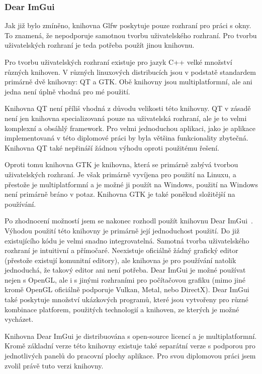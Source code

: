 \documentclass[czech,master]{diploma}
\begin{document}
\subsubsection{Dear ImGui}
Jak již bylo zmíněno, knihovna Glfw poskytuje pouze rozhraní pro práci s okny. To znamená, že nepodporuje samotnou tvorbu uživatelského rozhraní. Pro tvorbu uživatelských rozhraní je teda potřeba použít jinou knihovnu.\par
Pro tvorbu uživatelských rozhraní existuje pro jazyk C++ velké množství různých knihoven. V různých linuxových distribucích jsou v podstatě standardem primárně dvě knihovny: QT a GTK\@. Obě knihovny jsou multiplatformní, ale ani jedna není úplně vhodná pro mé použití.\par Knihovna QT není příliš vhodná z důvodu velikosti této knihovny. QT v zásadě není jen knihovna specializovaná pouze na uživatelská rozhraní, ale je to velmi komplexní a obsáhlý framework. Pro velmi jednoduchou aplikaci, jako je aplikace implementovaná v této diplomové práci by byla většina funkcionality zbytečná. Knihovna QT také nepřináší žádnou výhodu oproti použitému řešení.\par
Oproti tomu knihovna GTK je knihovna, která se primárně zabývá tvorbou uživatelských rozhraní. Je však primárně vyvíjena pro použití na Linuxu, a přestože je multiplatformní a je možné ji použít na Windows, použití na Windows není primárně bráno v potaz. Knihovna GTK je také poněkud složitější na používání.\par
Po zhodnocení možností jsem se nakonec rozhodl použít knihovnu Dear ImGui~\cite{sourceImgui}. Výhodou použití této knihovny je primárně její jednoduchost použití. Do již existujícího kódu je velmi snadno integrovatelná. Samotná tvorba uživatelského rozhraní je intuitivní a přímočaré. Neexistuje oficiálně žádný grafický editor (přestože existují komunitní editory), ale knihovna je pro používání natolik jednoduchá, že takový editor ani není potřeba. Dear ImGui je možné používat nejen s OpenGL, ale i s jinými rozhraními pro počítačovou grafiku (mimo jiné kromě OpenGL oficiálně podporuje Vulkan, Metal, nebo DirectX). Dear ImGui také poskytuje množství ukázkových programů, které jsou vytvořeny pro různé kombinace platforem, použitých technologií a knihoven, ze kterých je možné vycházet.\par
Knihovna Dear ImGui je distribuována s open-source licencí a je multiplatformní. Kromě základní verze této knihovny existuje také separátní verze s podporou pro  jednotlivých panelů do pracovní plochy aplikace. Pro svou diplomovou práci jsem zvolil právě tuto verzi knihovny.
\end{document}
